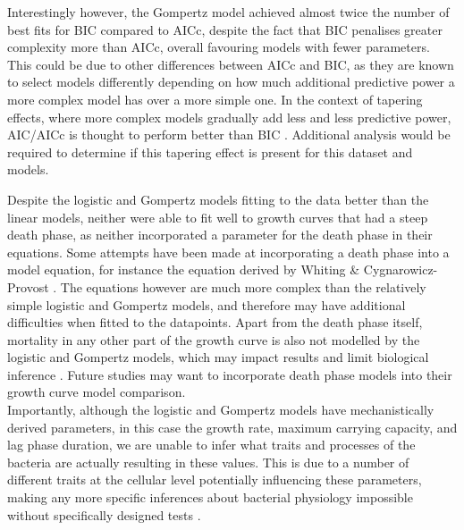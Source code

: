 \documentclass[11pt, letterpaper]{article}
\begin{document}
\noindent Interestingly however, the Gompertz model achieved almost twice the number of best fits for BIC compared to AICc, despite the fact that BIC penalises greater complexity more than AICc, overall favouring models with fewer parameters. This could be due to other differences between AICc and BIC, as they are known to select models differently depending on how much additional predictive power a more complex model has over a more simple one. In the context of tapering effects, where more complex models gradually add less and less predictive power, AIC/AICc is thought to perform better than BIC \citep{burnham&Anderson_2004}. Additional analysis would be required to determine if this tapering effect is present for this dataset and models. 

\noindent Despite the logistic and Gompertz models fitting to the data better than the linear models, neither were able to fit well to growth curves that had a steep death phase, as neither incorporated a parameter for the death phase in their equations. Some attempts have been made at incorporating a death phase into a model equation, for instance the equation derived by Whiting \& Cygnarowicz-Provost \citeyearpar{whiting_quantitative_1992}. The equations however are much more complex than the relatively simple logistic and Gompertz models, and therefore may have additional difficulties when fitted to the datapoints. Apart from the death phase itself, mortality in any other part of the growth curve is also not modelled by the logistic and Gompertz models, which may impact results and limit biological inference \citep{peleg_microbial_2011}. Future studies may want to incorporate death phase models into their growth curve model comparison. \\

\noindent Importantly, although the logistic and Gompertz models have mechanistically derived parameters, in this case the growth rate, maximum carrying capacity, and lag phase duration, we are unable to infer what traits and processes of the bacteria are actually resulting in these values. This is due to a number of different traits at the cellular level potentially influencing these parameters, making any more specific inferences about bacterial physiology impossible without specifically designed tests \citep{peleg_microbial_2011}.\\
\end{document}
